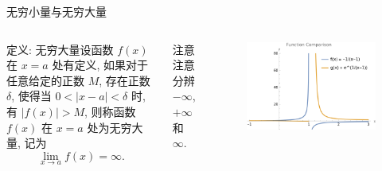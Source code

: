 \documentclass[
10pt,  
aspectratio=43,  
]{beamer}
\begin{document}
\begin{frame}[c]{无穷小量与无穷大量}
		
	\begin{columns}[onlytextwidth]
		
		
		\begin{block}{定义: 无穷大量}设函数 $f(x)$ 在 $x=a$ 处有定义,  如果对于任意给定的正数 $M$,  存在正数 $\delta$,  使得当 $0 < |x-a| < \delta$ 时,  有 $|f(x)| > M$,  则称函数 $f(x)$ 在 $x=a$ 处为无穷大量,  记为
			\begin{equation*}
				\lim_{x\to a}f(x) = \infty.
			\end{equation*}
		\end{block}
		\begin{exampleblock}{注意}
			注意分辨 $-\infty$,   $+\infty$ 和 $\infty$.
		\end{exampleblock}
		\begin{figure}
			\centering
			\includegraphics[width=0.8\linewidth]{infinity2.png}
			
		\end{figure}
	\end{columns}
\end{frame}	
\end{document}
